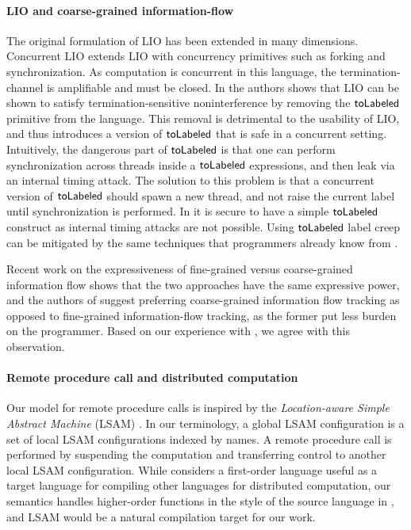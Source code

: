\paragraph{LIO and coarse-grained information-flow}
The original formulation of LIO \cite{SRMMlio} has been extended in many dimensions. Concurrent LIO \cite{Stefan:2012:ACT:2364527.2364557} extends LIO with concurrency primitives such as forking and synchronization. As computation is concurrent in this language, the termination-channel is amplifiable \cite{Askarov:2008:TNL:1462455.1462485} and must be closed. In \cite{Stefan:2012:ACT:2364527.2364557} the authors shows that LIO can be shown to satisfy termination-sensitive noninterference by removing the $\mathsf{toLabeled}$ primitive from the language. This removal is detrimental to the usability of LIO, and thus \cite{Stefan:2012:ACT:2364527.2364557} introduces a version of $\mathsf{toLabeled}$ that is safe in a concurrent setting. Intuitively, the dangerous part of $\mathsf{toLabeled}$ is that one can perform synchronization across threads inside a $\mathsf{toLabeled}$ expressions, and then leak via an internal timing attack. The solution to this problem is that a concurrent version of $\mathsf{toLabeled}$ should spawn a new thread, and not raise the current label until synchronization is performed. In \lang{} it is secure to have a simple $\mathsf{toLabeled}$ construct as internal timing attacks are not possible. Using $\mathsf{toLabeled}$ label creep can be mitigated by the same techniques that programmers already know from \cite{SRMMlio}.

Recent work \cite{Rajani:2017:TSI:3051528.3051531} on the expressiveness of fine-grained versus coarse-grained information flow shows that the two approaches have the same expressive power, and the authors of \cite{Rajani:2017:TSI:3051528.3051531} suggest preferring coarse-grained information flow tracking as opposed to fine-grained information-flow tracking, as the former put less burden on the programmer. Based on our experience with \lang{}, we agree with this observation.

\paragraph{Remote procedure call and distributed computation}
Our model for remote procedure calls is inspired by the \emph{Location-aware Simple Abstract Machine} (LSAM) \cite{10.1007/978-3-642-25462-8_28}. In our terminology, a global LSAM configuration is a set of local LSAM configurations indexed by names. A remote procedure call is performed by suspending the computation and transferring control to another local LSAM configuration. While \cite{10.1007/978-3-642-25462-8_28} considers a first-order language useful as a target language for compiling other languages for distributed computation, our semantics handles higher-order functions in the style of the source language in \cite{Cooper:2009:RC:1599410.1599439}, and LSAM would be a natural compilation target for our work.